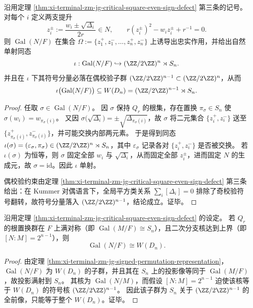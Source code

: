 \begin{theorem}[二次分支的有符号置换表示与 \(W(D_n)\) 约束]\label{thm:xi-terminal-zm-jg-signed-permutation-representation}
沿用定理 \ref{thm:xi-terminal-zm-jg-critical-square-even-sign-defect} 第三条的记号。
对每个 \(i\) 定义两支提升
\[
z_i^\pm:=\frac{w_i\pm\sqrt{\Delta_i}}{2r}\in N,
\qquad
r(z_i^\pm)^2-w_i z_i^\pm+r^{-1}=0.
\]
则 \(\operatorname{Gal}(N/F)\) 在集合
\(
\Omega:=\{z_1^+,z_1^-,\dots,z_n^+,z_n^-\}
\)
上诱导出忠实作用，并给出自然单射同态
\[
\iota:\operatorname{Gal}(N/F)\hookrightarrow (\ZZ/2\ZZ)^n\rtimes S_n.
\]
并且在 \(\iota\) 下其符号分量必落在偶校验子群 \((\ZZ/2\ZZ)^{n-1}\subset(\ZZ/2\ZZ)^n\)，从而
\[
\iota\bigl(\operatorname{Gal}(N/F)\bigr)\subseteq W(D_n)=(\ZZ/2\ZZ)^{n-1}\rtimes S_n.
\]
\end{theorem}
\begin{proof}
任取 \(\sigma\in\operatorname{Gal}(N/F)\)。
因 \(\sigma\) 保持 \(Q_r\) 的根集，存在置换 \(\pi_\sigma\in S_n\) 使 \(\sigma(w_i)=w_{\pi_\sigma(i)}\)。
又因 \(\sigma\bigl(\sqrt{\Delta_i}\bigr)=\pm \sqrt{\Delta_{\pi_\sigma(i)}}\)，故 \(\sigma\) 将二元集合 \(\{z_i^+,z_i^-\}\) 送至 \(\{z_{\pi_\sigma(i)}^+,z_{\pi_\sigma(i)}^-\}\)，并可能交换内部两元素。
于是得到同态 \(\iota(\sigma)=(\varepsilon_\sigma,\pi_\sigma)\in(\ZZ/2\ZZ)^n\rtimes S_n\)，其中 \(\varepsilon_\sigma\) 记录各对 \(\{z_i^+,z_i^-\}\) 是否被交换。
若 \(\iota(\sigma)\) 为恒等，则 \(\sigma\) 固定全部 \(w_i\) 与 \(\sqrt{\Delta_i}\)，从而固定全部 \(z_i^\pm\)，进而固定 \(N\) 的生成元，故 \(\sigma=\mathrm{id}\)。因此 \(\iota\) 单射。
\par
偶校验约束由定理 \ref{thm:xi-terminal-zm-jg-critical-square-even-sign-defect} 第三条给出：在 Kummer 对偶语言下，全局平方类关系 \(\sum_i[\Delta_i]=0\) 排除了奇校验符号翻转，故符号分量落入 \((\ZZ/2\ZZ)^{n-1}\)，结论成立。证毕。
\end{proof}

\begin{corollary}[满置换与满秩二次核迫使 \(W(D_n)\)]\label{cor:xi-terminal-zm-jg-wdn-forced}
沿用定理 \ref{thm:xi-terminal-zm-jg-critical-square-even-sign-defect} 的设定。
若 \(Q_r\) 的根置换群在 \(F\) 上满对称（即 \(\operatorname{Gal}(M/F)\cong S_n\)），且二次分支核达到上界（即 \([N:M]=2^{n-1}\)），则
\[
\operatorname{Gal}(N/F)\cong W(D_n).
\]
\end{corollary}
\begin{proof}
由定理 \ref{thm:xi-terminal-zm-jg-signed-permutation-representation}，\(\operatorname{Gal}(N/F)\) 为 \(W(D_n)\) 的子群，并且其在 \(S_n\) 上的投影像等同于 \(\operatorname{Gal}(M/F)\)，故投影满射到 \(S_n\)。
其核为 \(\operatorname{Gal}(N/M)\)，而假设 \([N:M]=2^{n-1}\) 迫使该核等于 \(W(D_n)\) 的符号核 \((\ZZ/2\ZZ)^{n-1}\)。
因此该子群为 \(S_n\) 关于 \((\ZZ/2\ZZ)^{n-1}\) 的全前像，只能等于整个 \(W(D_n)\)。证毕。
\end{proof}

